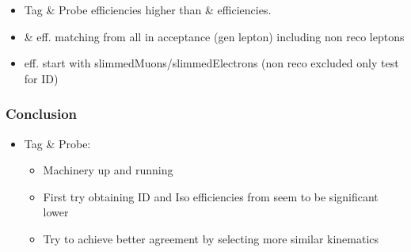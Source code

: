 \documentclass{beamer}
\begin{document}
\begin{frame}
\begin{columns}
\begin{column}{0.33\textwidth}
   \end{column}
  \end{columns}
\begin{itemize}
 \item Tag \& Probe efficiencies higher than \ttbar \& \wpj efficiencies.
 \item \ttbar \& \wpj eff. matching from all in acceptance (gen lepton) including non reco leptons
 \item \Zll eff. start with slimmedMuons/slimmedElectrons (non reco excluded only test for ID)
\end{itemize}

\end{frame}


\begin{frame}
 \frametitle{Conclusion}
 \begin{itemize}
  \item Tag \& Probe:
 \begin{itemize}
  \item Machinery up and running
  \item First try obtaining ID and Iso efficiencies from \Zll seem to be significant lower
  \item Try to achieve better agreement by selecting more similar kinematics
 \end{itemize}
 \end{itemize}
 

\end{frame}
\end{document}
